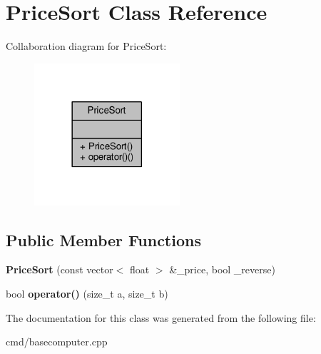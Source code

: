 \hypertarget{classPriceSort}{}\section{Price\+Sort Class Reference}
\label{classPriceSort}


Collaboration diagram for Price\+Sort\+:
\nopagebreak
\begin{figure}[H]
\begin{center}
\leavevmode
\includegraphics[width=153pt]{d2/d19/classPriceSort__coll__graph}
\end{center}
\end{figure}
\subsection*{Public Member Functions}
\begin{DoxyCompactItemize}
\item 
{\bfseries Price\+Sort} (const vector$<$ float $>$ \&\+\_\+price, bool \+\_\+reverse)\hypertarget{classPriceSort_a677083ae0d44374a806cc37abfce094d}{}\label{classPriceSort_a677083ae0d44374a806cc37abfce094d}

\item 
bool {\bfseries operator()} (size\+\_\+t a, size\+\_\+t b)\hypertarget{classPriceSort_a447aaf2d7e3c973f2cfd130cbf3ed710}{}\label{classPriceSort_a447aaf2d7e3c973f2cfd130cbf3ed710}

\end{DoxyCompactItemize}


The documentation for this class was generated from the following file\+:\begin{DoxyCompactItemize}
\item 
cmd/basecomputer.\+cpp\end{DoxyCompactItemize}
